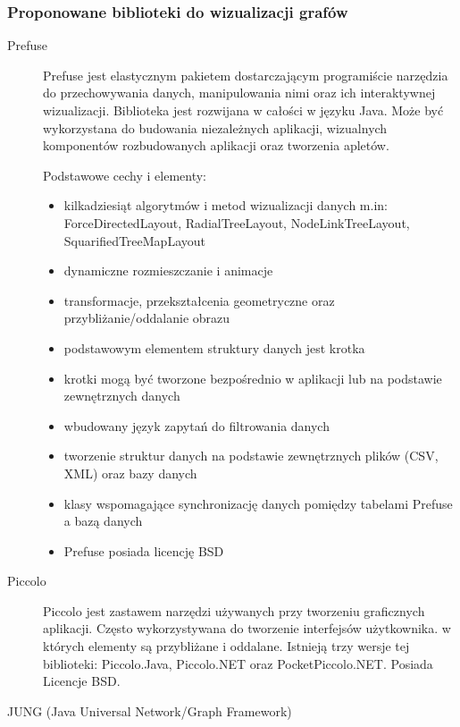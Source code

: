 	


	

	



\subsubsection{Proponowane biblioteki do wizualizacji grafów}


\begin{description}
\item[Prefuse]
 Prefuse jest elastycznym pakietem dostarczającym programiście narzędzia do przechowywania danych, manipulowania nimi oraz ich interaktywnej wizualizacji. Biblioteka jest rozwijana w całości w języku Java. Może być wykorzystana do budowania niezależnych aplikacji, wizualnych komponentów rozbudowanych aplikacji oraz tworzenia apletów.


Podstawowe cechy i elementy:
\begin{itemize}
\item kilkadziesiąt algorytmów i metod wizualizacji danych m.in: ForceDirectedLayout, RadialTreeLayout, NodeLinkTreeLayout, SquarifiedTreeMapLayout
\item dynamiczne rozmieszczanie i animacje
\item transformacje, przekształcenia geometryczne oraz przybliżanie/oddalanie obrazu
\item podstawowym elementem struktury danych jest krotka
\item krotki mogą być tworzone bezpośrednio w aplikacji lub na podstawie zewnętrznych danych
\item wbudowany język zapytań do filtrowania danych
\item tworzenie struktur danych na podstawie zewnętrznych plików (CSV, XML) oraz bazy danych
\item klasy wspomagające synchronizację danych pomiędzy tabelami Prefuse a bazą danych
\item Prefuse posiada licencję BSD
\end{itemize}

 \item[Piccolo]  


 Piccolo jest zastawem narzędzi używanych przy tworzeniu graficznych aplikacji. Często wykorzystywana do tworzenie interfejsów użytkownika. w których elementy są przybliżane i oddalane. Istnieją trzy wersje tej biblioteki: Piccolo.Java, Piccolo.NET oraz PocketPiccolo.NET. Posiada Licencje BSD.
\item[JUNG (Java Universal Network/Graph Framework)]


\end{description}
